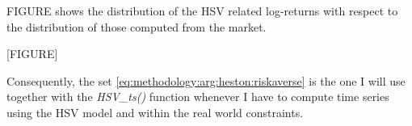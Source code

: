 \documentclass[12pt]{report}
\begin{document}
FIGURE shows the distribution of the HSV related log-returns with respect to the distribution of those computed from the market.

[FIGURE]

Consequently, the set \ref{eq:methodology:arg:heston:riskaverse} is the one I will use together with the \textit{HSV\_ts()} function whenever I have to compute time series using the HSV model and within the real world constraints.





























\end{document}
